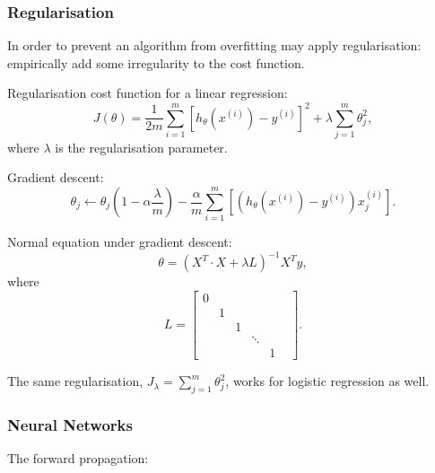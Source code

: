 \documentclass[a4paper,11pt]{article}
\begin{document}
\subsubsection{Regularisation}
In order to prevent an algorithm from overfitting may apply regularisation: empirically add some irregularity to the cost function.

Regularisation cost function for a linear regression:
\begin{equation}
J \left( \theta \right) = \frac{1}{2m} \sum_{i = 1} ^m \left[ h_\theta (x^{(i)}) - y^{(i)} \right]^2 + \lambda \sum_{j = 1} ^m \theta_j ^2 ,
\end{equation}
where \textcolor{OliveGreen}{$\lambda$} is the regularisation parameter.

Gradient descent:
\begin{equation}
\theta_j \leftarrow \theta_j \left(1 - \alpha\frac{\lambda}{m} \right) - \frac{\alpha}{m} \sum_{i = 1} ^m \left[ \left( h_\theta (x^{(i)}) - y^{(i)} \right) x_j ^{(i)} \right] . \label{dtheta_lambda}
\end{equation}

Normal equation under gradient descent:
\begin{equation}
\theta = \left( X^T \cdot X + \lambda L \right)^{-1} X^T y ,
\end{equation}
where
\begin{equation}
L = \begin{bmatrix}
	0 & & & & & \\
	& 1 & & & & \\
	& & 1 & & & \\
    & & & \ddots & & \\
    & & & & 1
\end{bmatrix} .
\end{equation}

The same regularisation, \textcolor{OliveGreen}{$J_\lambda = \sum\limits_{j=1} ^m \theta_j ^2$}, works for logistic regression as well.
\subsubsection{Neural Networks}
The forward propagation:
\end{document}

